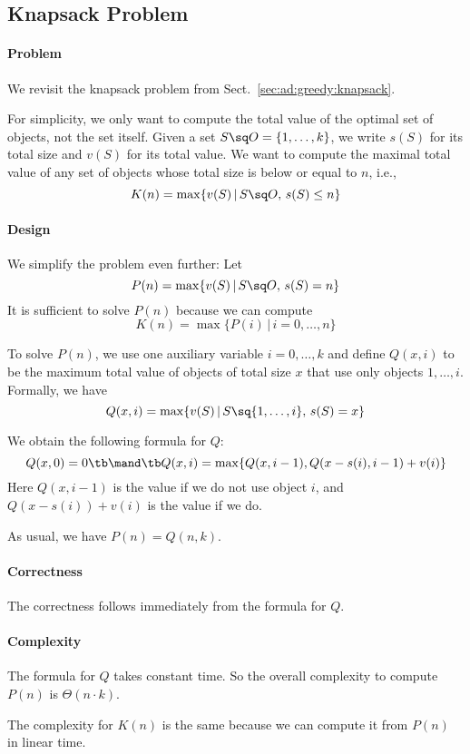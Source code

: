 \subsection{Knapsack Problem}\label{sec:ad:dynamic:knapsack}

\paragraph{Problem}
We revisit the knapsack problem from Sect.~\ref{sec:ad:greedy:knapsack}.

For simplicity, we only want to compute the total value of the optimal set of objects, not the set itself.
Given a set $S\sq O=\{1,\ldots,k\}$, we write $s(S)$ for its total size and $v(S)$ for its total value.
We want to compute the maximal total value of any set of objects whose total size is below or equal to $n$, i.e.,
\[K(n)=\max \{v(S) \,|\, S\sq O,\,s(S)\leq n\}\]

\paragraph{Design}
We simplify the problem even further: Let
\[P(n)=\max \{v(S) \,|\, S\sq O,\,s(S) = n\}\]
It is sufficient to solve $P(n)$ because we can compute
\[K(n)=\max \{P(i)\,|\,i=0,\ldots,n\}\]

To solve $P(n)$, we use one auxiliary variable $i=0,\ldots,k$ and define $Q(x,i)$ to be the maximum total value of objects of total size $x$ that use only objects $1,\ldots, i$.
Formally, we have
\[Q(x,i)=\max \{v(S) \,|\, S\sq \{1,\ldots,i\},\,s(S) = x\}\]

We obtain the following formula for $Q$:
\[Q(x,0)=0 \tb\mand\tb Q(x,i)=\max \{Q(x, i-1), Q(x-s(i), i-1)+v(i)\}\]
Here $Q(x,i-1)$ is the value if we do not use object $i$, and $Q(x-s(i))+v(i)$ is the value if we do.

As usual, we have $P(n)=Q(n,k)$.

\paragraph{Correctness}
The correctness follows immediately from the formula for $Q$.

\paragraph{Complexity}
The formula for $Q$ takes constant time. So the overall complexity to compute $P(n)$ is $\Theta(n\cdot k)$.

The complexity for $K(n)$ is the same because we can compute it from $P(n)$ in linear time.

%
